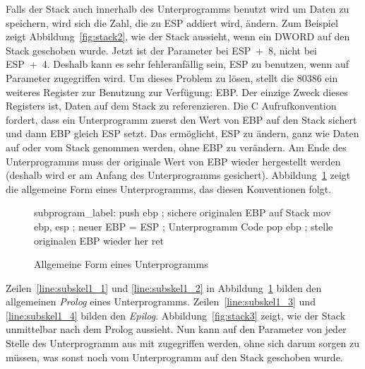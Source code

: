 Falls der Stack auch innerhalb des Unterprogramms benutzt wird um
Daten zu speichern, wird sich die Zahl, die zu ESP addiert wird,
\"{a}ndern. Zum Beispiel zeigt Abbildung~\ref{fig:stack2}, wie der Stack
aussieht, wenn ein DWORD auf den Stack geschoben wurde. Jetzt ist
der Parameter bei {\code ESP~+~8}, nicht bei {\code ESP~+~4}.
Deshalb kann es sehr fehleranf\"{a}llig sein, ESP zu benutzen, wenn auf
Parameter zugegriffen wird. Um dieses Problem zu l\"{o}sen, stellt die
80386 ein weiteres Register zur Benutzung zur Verf\"{u}gung: EBP\@.
 Der einzige Zweck dieses Registers ist,
Daten auf dem Stack zu referenzieren. Die C Aufrufkonvention
fordert, dass ein Unterprogramm zuerst den Wert von EBP auf den
Stack sichert und dann EBP gleich ESP setzt. Das erm\"{o}glicht, ESP zu
\"{a}ndern, ganz wie Daten auf oder vom Stack genommen werden, ohne EBP
zu ver\"{a}ndern. Am Ende des Unterprogramms muss der originale Wert von
EBP wieder hergestellt werden (deshalb wird er am Anfang des
Unterprogramms gesichert). Abbildung~\ref{fig:subskel1} zeigt die
allgemeine Form eines Unterprogramms, das diesen Konventionen folgt.

\begin{figure}[ht]
\begin{AsmCodeListing}[frame=single, numbers=left, commandchars=\\\{\}]
 subprogram_label:
      push   ebp            ; sichere originalen EBP auf Stack  \label{line:subskel1_1}
      mov    ebp, esp       ; neuer EBP = ESP                   \label{line:subskel1_2}
 ; Unterprogramm Code
      pop    ebp            ; stelle originalen EBP wieder her  \label{line:subskel1_3}
      ret                                                       \label{line:subskel1_4}
\end{AsmCodeListing}
\caption{Allgemeine Form eines Unterprogramms \label{fig:subskel1}}
\end{figure}

Zeilen~\ref{line:subskel1_1} und \ref{line:subskel1_2} in
Abbildung~\ref{fig:subskel1} bilden den allgemeinen \emph{Prolog}
 eines Unterprogramms.
Zeilen~\ref{line:subskel1_3} und \ref{line:subskel1_4} bilden den
\emph{Epilog}. 
Abbildung~\ref{fig:stack3} zeigt, wie der Stack unmittelbar nach dem
Prolog aussieht. Nun kann auf den Parameter von jeder Stelle des
Unterprogramm aus mit {\code [EBP + 8]} zugegriffen werden, ohne
sich darum sorgen zu m\"{u}ssen, was sonst noch vom Unterprogramm auf
den Stack geschoben wurde.

